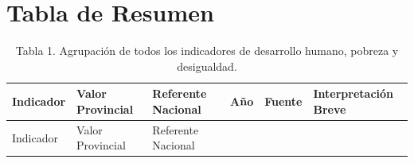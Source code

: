 \documentclass[
  letterpaper,
  DIV=11,
  numbers=noendperiod]{scrartcl}
\author{}
\date{}
\begin{document}
\section{Tabla de Resumen}\label{tabla-de-resumen}

\begin{landscape}

\begin{longtable}[]{@{}
  >{\raggedright\arraybackslash}p{}
  >{\raggedright\arraybackslash}p{}
  >{\raggedright\arraybackslash}p{}
  >{\centering\arraybackslash}p{}
  >{\raggedright\arraybackslash}p{}
  >{\raggedright\arraybackslash}p{}@{}}
\caption{Tabla 1. Agrupación de todos los indicadores de desarrollo
humano, pobreza y desigualdad.}\label{tbl-resumen}\tabularnewline
\toprule\noalign{}
\begin{minipage}[b]{\linewidth}\raggedright
Indicador
\end{minipage} & \begin{minipage}[b]{\linewidth}\raggedright
Valor Provincial
\end{minipage} & \begin{minipage}[b]{\linewidth}\raggedright
Referente Nacional
\end{minipage} & \begin{minipage}[b]{\linewidth}\centering
Año
\end{minipage} & \begin{minipage}[b]{\linewidth}\raggedright
Fuente
\end{minipage} & \begin{minipage}[b]{\linewidth}\raggedright
Interpretación Breve
\end{minipage} \\
\midrule\noalign{}
\endfirsthead
\toprule\noalign{}
\begin{minipage}[b]{\linewidth}\raggedright
Indicador
\end{minipage} & \begin{minipage}[b]{\linewidth}\raggedright
Valor Provincial
\end{minipage} & \begin{minipage}[b]{\linewidth}\raggedright
Referente Nacional
\end{minipage} & \begin{minipage}[b]{\linewidth}\centering

\end{minipage}
\end{longtable}
\end{landscape}
\end{document}
